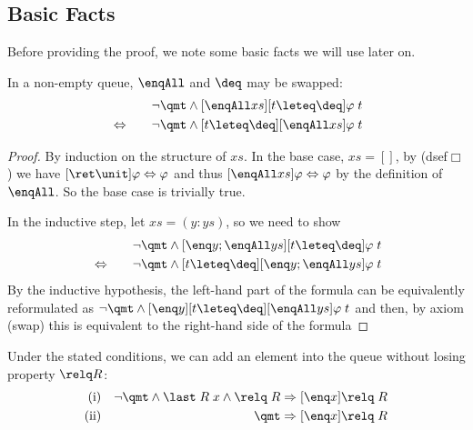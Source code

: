 \subsection{Basic Facts}
Before providing the proof, we note some basic facts we will use later on.
\begin{lem}
In a non-empty queue, $\enqAll$ and $\deq$ may be swapped:
\label{enqAll-deq}
\begin{eqnarray*}
&& \lnot \qmt \land [\enqAll xs][t\leteq\deq]\varphi\;t \\
&\Leftrightarrow \quad& \lnot \qmt \land [t\leteq\deq][\enqAll xs]\varphi\;t
\end{eqnarray*}
\end{lem}

\begin{proof}
By induction on the structure of $xs$. In the base case, $xs = []$, by
(dsef$\Box$) we have $[\ret\unit]\varphi \Leftrightarrow \varphi$ and thus $[\enqAll xs]\varphi \Leftrightarrow \varphi$
by the definition of $\enqAll$. So the base case is trivially true.

In the inductive step, let $xs = (y: ys)$, so we need to show
\begin{eqnarray*}
&& \lnot \qmt \land [\enq y; \enqAll ys][t\leteq\deq]\varphi\;t \\
&\Leftrightarrow \quad& \lnot \qmt \land [t\leteq\deq][\enq y; \enqAll ys]\varphi\;t
\end{eqnarray*}
By the inductive hypothesis, the left-hand part of the formula can be
equivalently 
reformulated as $\lnot \qmt\land [\enq y][t\leteq\deq][\enqAll ys]\varphi\;t$ and then, by axiom
(swap) this is equivalent to the right-hand side of the formula
\end{proof}


\begin{lem}
\label{thm:enq-relq}
Under the stated conditions, we can add an element into the queue without
losing property $\relq R$:
\begin{eqnarray*}
\text{(i)} && \lnot \qmt \land \last\; R\;x \land \relq\; R \Rightarrow [\enq x]\relq\; R \\
\text{(ii)} && \qmt \Rightarrow [\enq x]\relq\; R
\end{eqnarray*}
\end{lem}

